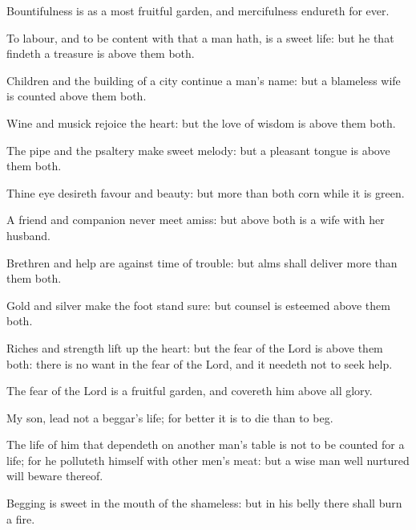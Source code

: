 {\par }{\PP {}Bountifulness is as a most fruitful garden, and mercifulness endureth for ever.
\par }{\PP {}To labour, and to be content with that a man hath, is a sweet life: but he that findeth a treasure is above them both.
\par }{\PP {}Children and the building of a city continue a man’s name: but a blameless wife is counted above them both.
\par }{\PP {}Wine and musick rejoice the heart: but the love of wisdom is above them both.
\par }{\PP {}The pipe and the psaltery make sweet melody: but a pleasant tongue is above them both.
\par }{\PP {}Thine eye desireth favour and beauty: but more than both corn while it is green.
\par }{\PP {}A friend and companion never meet amiss: but above both is a wife with her husband.
\par }{\PP {}Brethren and help are against time of trouble: but alms shall deliver more than them both.
\par }{\PP {}Gold and silver make the foot stand sure: but counsel is esteemed above them both.
\par }{\PP {}Riches and strength lift up the heart: but the fear of the Lord is above them both: there is no want in the fear of the Lord, and it needeth not to seek help.
\par }{\PP {}The fear of the Lord is a fruitful garden, and covereth him above all glory.
\par }{\PP {}My son, lead not a beggar’s life; for better it is to die than to beg.
\par }{\PP {}The life of him that dependeth on another man’s table is not to be counted for a life; for he polluteth himself with other men’s meat: but a wise man well nurtured will beware thereof.
\par }{\PP {}Begging is sweet in the mouth of the shameless: but in his belly there shall burn a fire.

}
